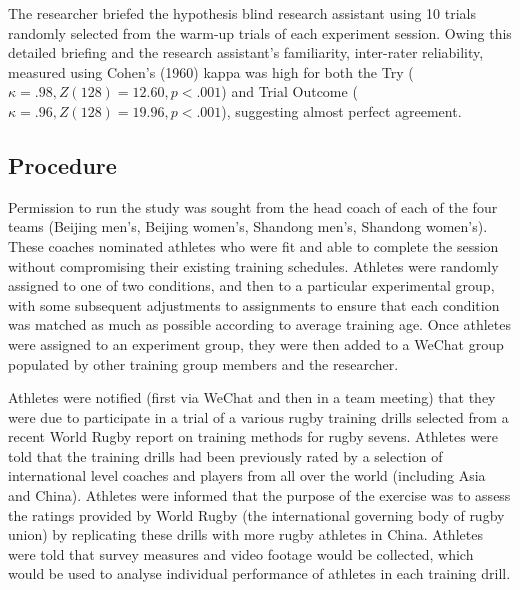 The researcher briefed the hypothesis blind research assistant using 10 trials randomly selected from the warm-up trials of each experiment session. Owing this detailed briefing and the research assistant's familiarity, inter-rater reliability, measured using Cohen's (1960) kappa \citep[suitable for two coders, see][]{DiEugenio2004} was high for both the Try ($\kappa = .98, Z(128) = 12.60, p < .001$) and Trial Outcome ($\kappa = .96, Z(128) = 19.96, p < .001$), suggesting almost perfect agreement.

\subsection{Procedure}
Permission to run the study was sought from the head coach of each of the four teams (Beijing men's, Beijing women's, Shandong men's, Shandong women's).  These coaches nominated athletes who were fit and able to complete the session without compromising their existing training schedules.  Athletes were randomly assigned to one of two conditions, and then to a particular experimental group, with some subsequent adjustments to assignments to ensure that each condition was matched as much as possible according to average training age.  Once athletes were assigned to an experiment group, they were then added to a WeChat group populated by other training group members and the researcher.

Athletes were notified (first via WeChat and then in a team meeting) that they were due to participate in a trial of a various rugby training drills selected from a recent World Rugby report on training methods for rugby sevens.  Athletes were told that the training drills had been previously rated by a selection of international level coaches and players from all over the world (including Asia and China).  Athletes were informed that the purpose of the exercise was to assess the ratings provided by World Rugby (the international governing body of rugby union) by replicating these drills with more rugby athletes in China.  Athletes were told that survey measures and video footage would be collected, which would be used to analyse individual performance of athletes in each training drill.


